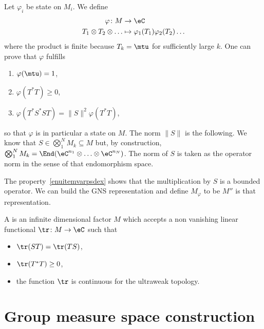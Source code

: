Let $\varphi_i$ be state on $M_i$. We define
\begin{equation}
	\begin{aligned}
		\varphi\colon M             & \to \eC                                    \\
		T_1\otimes T_2\otimes\ldots & \mapsto \varphi_1(T_1)\varphi_2(T_2)\ldots
	\end{aligned}
\end{equation}
where the product is finite because $T_k=\mtu$ for sufficiently large $k$. One can prove that $\varphi$ fulfills
\begin{enumerate}
	\item $\varphi(\mtu)=1$,
	\item $\varphi(T^*T)\geq 0$,
	      \item\label{enuitemvarpsdex} $\varphi(T^*S^*ST)=\| S \|^2\varphi(T^*T)$,
\end{enumerate}
so that $\varphi$ is in particular a state on $M$. The norm $\| S \|$ is the following. We know that $S\in\bigotimes_1^NM_k\subseteq M$ but, by construction, $\bigotimes_1^NM_k=\End(\eC^{n_1}\otimes\ldots\otimes \eC^{n_N})$. The norm of $S$ is taken as the operator norm in the sense of that endomorphism space.

The property~\ref{enuitemvarpsdex} shows that the multiplication by $S$ is a bounded operator. We can build the GNS representation and define $M_{\varphi}$ to be $M''$ is that representation.

\begin{definition}
	A  is an infinite dimensional factor $M$ which accepts a non vanishing linear functional $\tr\colon M\to \eC$ such that
	\begin{itemize}
		\item $\tr(ST)=\tr(TS)$,
		\item $\tr(T^*T)\geq 0$,
		\item the function $\tr$ is continuous for the ultraweak topology.
	\end{itemize}
\end{definition}


\section{Group measure space construction}

